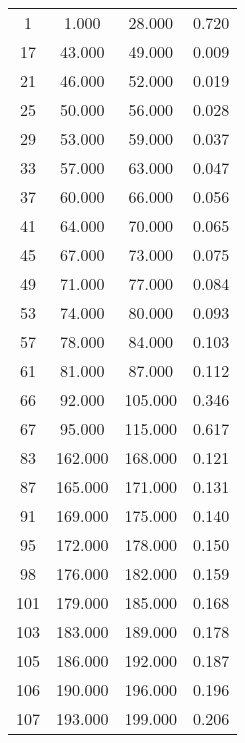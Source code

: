 % 
\begin{tabular}{cccc}
  \hline
  \hline
1 & 1.000 & 28.000 & 0.720 \\ 
  17 & 43.000 & 49.000 & 0.009 \\ 
  21 & 46.000 & 52.000 & 0.019 \\ 
  25 & 50.000 & 56.000 & 0.028 \\ 
  29 & 53.000 & 59.000 & 0.037 \\ 
  33 & 57.000 & 63.000 & 0.047 \\ 
  37 & 60.000 & 66.000 & 0.056 \\ 
  41 & 64.000 & 70.000 & 0.065 \\ 
  45 & 67.000 & 73.000 & 0.075 \\ 
  49 & 71.000 & 77.000 & 0.084 \\ 
  53 & 74.000 & 80.000 & 0.093 \\ 
  57 & 78.000 & 84.000 & 0.103 \\ 
  61 & 81.000 & 87.000 & 0.112 \\ 
  66 & 92.000 & 105.000 & 0.346 \\ 
  67 & 95.000 & 115.000 & 0.617 \\ 
  83 & 162.000 & 168.000 & 0.121 \\ 
  87 & 165.000 & 171.000 & 0.131 \\ 
  91 & 169.000 & 175.000 & 0.140 \\ 
  95 & 172.000 & 178.000 & 0.150 \\ 
  98 & 176.000 & 182.000 & 0.159 \\ 
  101 & 179.000 & 185.000 & 0.168 \\ 
  103 & 183.000 & 189.000 & 0.178 \\ 
  105 & 186.000 & 192.000 & 0.187 \\ 
  106 & 190.000 & 196.000 & 0.196 \\ 
  107 & 193.000 & 199.000 & 0.206 \\ 
   \hline
\end{tabular}
